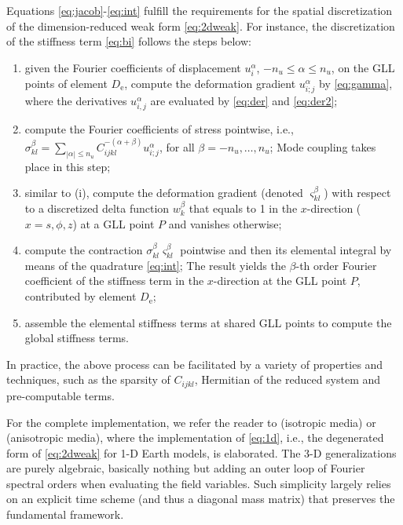 \documentclass[extra,referee]{gji}
\begin{document}
Equations \eqref{eq:jacob}-\eqref{eq:int} fulfill
the requirements for the spatial discretization of the 
dimension-reduced weak form \eqref{eq:2dweak}. 
For instance, the discretization of the stiffness term \eqref{eq:bi} 
follows the steps below:
\begin{enumerate}
  \item given the Fourier coefficients of displacement 
  $u_i^\alpha$, $-n_u\le\alpha\le n_u$, 
  on the GLL points of element $D_\text{e}$, compute the deformation gradient 
  $u_{i;j}^\alpha$ by \eqref{eq:gamma},
  where the derivatives $u_{i,j}^\alpha$ are evaluated 
  by \eqref{eq:der} and \eqref{eq:der2}; 
  \item compute the Fourier coefficients of stress pointwise, i.e., $\sigma_{kl}^\beta=
  \sum_{|\alpha|\le n_u}C_{ijkl}^{-\left(\alpha+\beta\right)} u_{i;j}^\alpha$, 
  for all $\beta=-n_u,\dots, n_u$; Mode coupling takes place in this step;
  \item similar to (i), compute the deformation gradient (denoted $\varsigma_{kl}^\beta$) with respect to 
  a discretized delta function $w_k^\beta$ that equals to 1 in the $x$-direction  
  ($x=s,\phi,z$) at a GLL point $P$ and vanishes otherwise; 
  \item compute the contraction $\sigma_{kl}^\beta \varsigma_{kl}^\beta$ pointwise
  and then its elemental integral by means of the quadrature \eqref{eq:int}; 
  The result yields the $\beta$-th order Fourier coefficient of the
  stiffness term in the $x$-direction at the GLL point $P$,
  contributed by element $D_\text{e}$; 
  \item assemble the elemental stiffness terms at shared GLL points to compute
  the global stiffness terms.
\end{enumerate}
In practice, the above process can be facilitated by a variety of 
properties and techniques, such as the sparsity of $C_{ijkl}$,
Hermitian of the reduced system and pre-computable terms. 

For the complete implementation, we refer the reader to \cite{nissen2007sem} 
(isotropic media) or \cite{van2014seismic} (anisotropic media),
where the implementation of \eqref{eq:1d}, i.e.,
the degenerated form of \eqref{eq:2dweak} for 1-D Earth models,
is elaborated. The 3-D generalizations are purely algebraic, basically
nothing but adding an outer loop of Fourier spectral orders when evaluating the
field variables. Such simplicity largely relies on
an explicit time scheme (and thus a diagonal mass matrix) that preserves 
the fundamental framework.  
\end{document}
